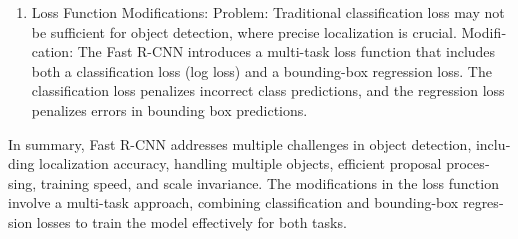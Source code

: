 \documentclass{article}
\begin{document}
\begin{latin}
\begin{enumerate}
    \item Loss Function Modifications:
        Problem: Traditional classification loss may not be sufficient for object detection, where precise localization is crucial.
        Modification: The Fast R-CNN introduces a multi-task loss function that includes both a classification loss (log loss) and a bounding-box regression loss. The classification loss penalizes incorrect class predictions, and the regression loss penalizes errors in bounding box predictions.
\end{enumerate}

In summary, Fast R-CNN addresses multiple challenges in object detection, including localization accuracy, handling multiple objects, efficient proposal processing, training speed, and scale invariance. The modifications in the loss function involve a multi-task approach, combining classification and bounding-box regression losses to train the model effectively for both tasks.
\end{latin}


\end{document}
